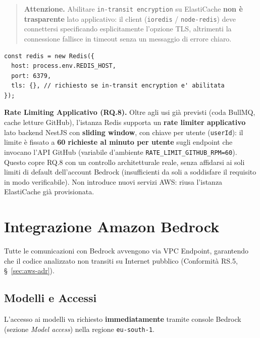 \documentclass[11pt,a4paper]{article}
\begin{document}
\begin{quote}
\textbf{Attenzione.} Abilitare \texttt{in-transit encryption} su ElastiCache \textbf{non è trasparente} lato applicativo: il client (\texttt{ioredis} / \texttt{node-redis}) deve connettersi specificando esplicitamente l'opzione TLS, altrimenti la connessione fallisce in timeout senza un messaggio di errore chiaro.
\end{quote}

\begin{lstlisting}[caption={Connessione ioredis con TLS abilitato}]
const redis = new Redis({
  host: process.env.REDIS_HOST,
  port: 6379,
  tls: {}, // richiesto se in-transit encryption e' abilitata
});
\end{lstlisting}

\textbf{Rate Limiting Applicativo (RQ.8).} Oltre agli usi già previsti (coda BullMQ, cache letture GitHub), l'istanza Redis supporta un \textbf{rate limiter applicativo} lato backend NestJS con \textbf{sliding window}, con chiave per utente (\texttt{userId}): il limite è fissato a \textbf{60 richieste al minuto per utente} sugli endpoint che invocano l'API GitHub (variabile d'ambiente \texttt{RATE\_LIMIT\_\allowbreak{}GITHUB\_\allowbreak{}RPM=60}). Questo copre RQ.8 con un controllo architetturale reale, senza affidarsi ai soli limiti di default dell'account Bedrock (insufficienti da soli a soddisfare il requisito in modo verificabile). Non introduce nuovi servizi AWS: riusa l'istanza ElastiCache già provisionata.

\section{Integrazione Amazon Bedrock}

Tutte le comunicazioni con Bedrock avvengono via VPC Endpoint, garantendo che il codice analizzato non transiti su Internet pubblico (Conformità RS.5, \S~\ref{sec:aws-adr}).

\subsection{Modelli e Accessi}

L'accesso ai modelli va richiesto \textbf{immediatamente} tramite console Bedrock (sezione \emph{Model access}) nella regione \texttt{eu-south-1}.
\end{document}
